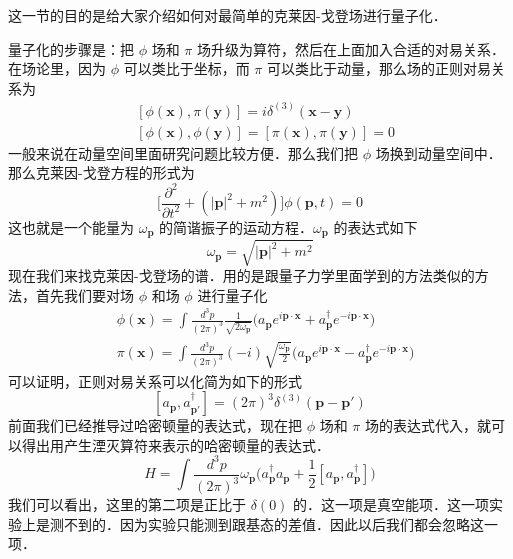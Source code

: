 这一节的目的是给大家介绍如何对最简单的克莱因-戈登场进行量子化．

量子化的步骤是：把 $\phi$ 场和 $\pi$ 场升级为算符，然后在上面加入合适的对易关系．在场论里，因为 $\phi$ 可以类比于坐标，而 $\pi$ 可以类比于动量，那么场的正则对易关系为
\begin{equation}
\begin{aligned}
& [\phi(\mathbf x),\pi(\mathbf y)] = i \delta^{(3)}(\mathbf x- \mathbf y) \\
& [\phi(\mathbf x),\phi(\mathbf y)]  = [\pi(\mathbf x),\pi(\mathbf y)] = 0
\end{aligned}
\end{equation}
一般来说在动量空间里面研究问题比较方便．那么我们把 $\phi$ 场换到动量空间中．那么克莱因-戈登方程的形式为
\begin{equation}
\bigg[\frac{\partial^2}{\partial t^2}+(|\mathbf p|^2+m^2)\bigg] \phi(\mathbf p, t) = 0
\end{equation}
这也就是一个能量为 $\omega_{\mathbf p}$ 的简谐振子的运动方程．$\omega_{\mathbf p}$ 的表达式如下
\begin{equation}
\omega_{\mathbf p} = \sqrt{|\mathbf p|^2+m^2}
\end{equation}
现在我们来找克莱因-戈登场的谱．用的是跟量子力学里面学到的方法类似的方法，首先我们要对场 $\phi$ 和场 $\phi$ 进行量子化
\begin{equation}\label{quanti_eq3}
\begin{aligned}
& \phi(\mathbf x) = \int \frac{d^3p}{(2\pi)^3} \frac{1}{\sqrt{2\omega_{\mathbf p}}}\bigg( a_{\mathbf p} e^{i \mathbf p \cdot \mathbf x} + a_{\mathbf p}^\dagger e^{-i\mathbf p \cdot \mathbf x} \bigg) \\
& \pi(\mathbf x) = \int \frac{d^3p}{(2\pi)^3} (-i) \sqrt{\frac{\omega_{\mathbf p}}{2}} \bigg( a_{\mathbf p} e^{i \mathbf p \cdot \mathbf x} - a^{\dagger}_{\mathbf p} e^{-i \mathbf p \cdot \mathbf x} \bigg)
\end{aligned}
\end{equation}
可以证明，正则对易关系可以化简为如下的形式
\begin{equation}\label{quanti_eq2}
[a_{\mathbf p},a_{\mathbf p'}^\dagger] = (2\pi)^3 \delta^{(3)} (\mathbf p - \mathbf p')
\end{equation}
前面我们已经推导过哈密顿量的表达式，现在把 $\phi$ 场和 $\pi$ 场的表达式代入，就可以得出用产生湮灭算符来表示的哈密顿量的表达式．
\begin{equation}\label{quanti_eq1}
H = \int \frac{d^3p}{(2\pi)^3} \omega_{\mathbf p} \bigg(  a^\dagger_{\mathbf p} a_{\mathbf p} + \frac{1}{2} [a_{\mathbf p},a^\dagger_{\mathbf p}] \bigg)
\end{equation}
我们可以看出，这里的第二项是正比于 $\delta(0)$ 的．这一项是真空能项．这一项实验上是测不到的．因为实验只能测到跟基态的差值．因此以后我们都会忽略这一项．

